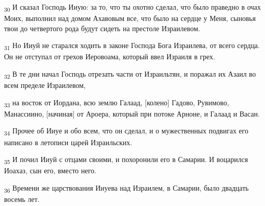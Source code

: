 \begin{tcolorbox}
\textsubscript{30} И сказал Господь Ииую: за то, что ты охотно сделал, что было праведно в очах Моих, выполнил над домом Ахавовым все, что было на сердце у Меня, сыновья твои до четвертого рода будут сидеть на престоле Израилевом.
\end{tcolorbox}
\begin{tcolorbox}
\textsubscript{31} Но Ииуй не старался ходить в законе Господа Бога Израилева, от всего сердца. Он не отступал от грехов Иеровоама, который ввел Израиля в грех.
\end{tcolorbox}
\begin{tcolorbox}
\textsubscript{32} В те дни начал Господь отрезать части от Израильтян, и поражал их Азаил во всем пределе Израилевом,
\end{tcolorbox}
\begin{tcolorbox}
\textsubscript{33} на восток от Иордана, всю землю Галаад, [колено] Гадово, Рувимово, Манассиино, [начиная] от Ароера, который при потоке Арноне, и Галаад и Васан.
\end{tcolorbox}
\begin{tcolorbox}
\textsubscript{34} Прочее об Ииуе и обо всем, что он сделал, и о мужественных подвигах его написано в летописи царей Израильских.
\end{tcolorbox}
\begin{tcolorbox}
\textsubscript{35} И почил Ииуй с отцами своими, и похоронили его в Самарии. И воцарился Иоахаз, сын его, вместо него.
\end{tcolorbox}
\begin{tcolorbox}
\textsubscript{36} Времени же царствования Ииуева над Израилем, в Самарии, было двадцать восемь лет.
\end{tcolorbox}
